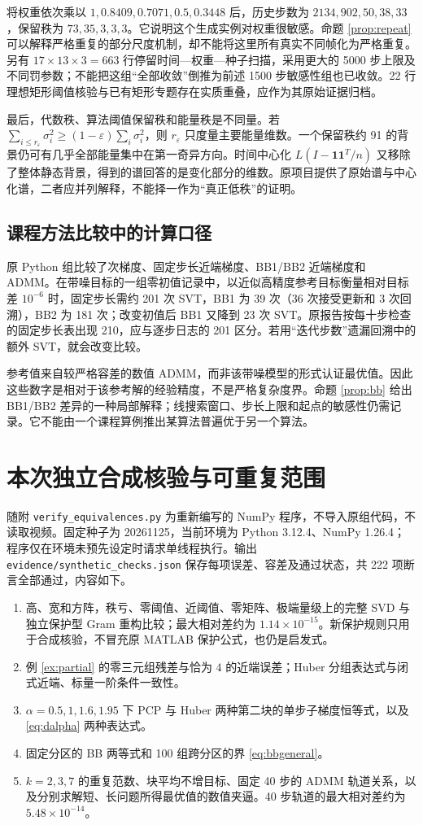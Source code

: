 \documentclass[UTF8,fontset=none,zihao=-4,a4paper]{ctexart}
\theoremstyle{plainzh}
\numberwithin{equation}{section}
\begin{document}
将权重依次乘以 $1,0.8409,0.7071,0.5,0.3448$ 后，历史步数为 $2134,902,50,38,33$，保留秩为 $73,35,3,3,3$。它说明这个生成实例对权重很敏感。命题 \ref{prop:repeat} 可以解释严格重复的部分尺度机制，却不能将这里所有真实不同帧化为严格重复。另有 $17\times13\times3=663$ 行停留时间—权重—种子扫描，采用更大的 5000 步上限及不同罚参数；不能把这组“全部收敛”倒推为前述 1500 步敏感性组也已收敛。22 行理想矩形阈值核验与已有矩形专题存在实质重叠，应作为其原始证据归档。

最后，代数秩、算法阈值保留秩和能量秩是不同量。若 $\sum_{i\leq r_\varepsilon}\sigma_i^2\geq(1-\varepsilon)\sum_i\sigma_i^2$，则 $r_\varepsilon$ 只度量主要能量维数。一个保留秩约 91 的背景仍可有几乎全部能量集中在第一奇异方向。时间中心化 $L(I-\mathbf1\mathbf1^T/n)$ 又移除了整体静态背景，得到的谱回答的是变化部分的维数。原项目提供了原始谱与中心化谱，二者应并列解释，不能择一作为“真正低秩”的证明。

\subsection{课程方法比较中的计算口径}
原 Python 组比较了次梯度、固定步长近端梯度、BB1/BB2 近端梯度和 ADMM。在带噪目标的一组零初值记录中，以近似高精度参考目标衡量相对目标差 $10^{-6}$ 时，固定步长需约 201 次 SVT，BB1 为 39 次（36 次接受更新和 3 次回溯），BB2 为 181 次；改变初值后 BB1 又降到 23 次 SVT。原报告按每十步检查的固定步长表出现 210，应与逐步日志的 201 区分。若用“迭代步数”遗漏回溯中的额外 SVT，就会改变比较。

参考值来自较严格容差的数值 ADMM，而非该带噪模型的形式认证最优值。因此这些数字是相对于该参考解的经验精度，不是严格复杂度界。命题 \ref{prop:bb} 给出 BB1/BB2 差异的一种局部解释；线搜索窗口、步长上限和起点的敏感性仍需记录。它不能由一个课程算例推出某算法普遍优于另一个算法。

\section{本次独立合成核验与可重复范围}
随附 \texttt{verify\_equivalences.py} 为重新编写的 NumPy 程序，不导入原组代码，不读取视频。固定种子为 20261125，当前环境为 Python 3.12.4、NumPy 1.26.4；程序仅在环境未预先设定时请求单线程执行。输出 \texttt{evidence/synthetic\_checks.json} 保存每项误差、容差及通过状态，共 222 项断言全部通过，内容如下。
\begin{enumerate}
\item 高、宽和方阵，秩亏、零阈值、近阈值、零矩阵、极端量级上的完整 SVD 与独立保护型 Gram 重构比较；最大相对差约为 $1.14\times10^{-15}$。新保护规则只用于合成核验，不冒充原 MATLAB 保护公式，也仍是启发式。
\item 例 \ref{ex:partial} 的零三元组残差与恰为 $4$ 的近端误差；Huber 分组表达式与闭式近端、标量一阶条件一致性。
\item $\alpha=0.5,1,1.6,1.95$ 下 PCP 与 Huber 两种第二块的单步子梯度恒等式，以及 \eqref{eq:dalpha} 两种表达式。
\item 固定分区的 BB 两等式和 100 组跨分区的界 \eqref{eq:bbgeneral}。
\item $k=2,3,7$ 的重复范数、块平均不增目标、固定 40 步的 ADMM 轨道关系，以及分别求解短、长问题所得最优值的数值夹逼。40 步轨道的最大相对差约为 $5.48\times10^{-14}$。
\end{enumerate}
\end{document}
